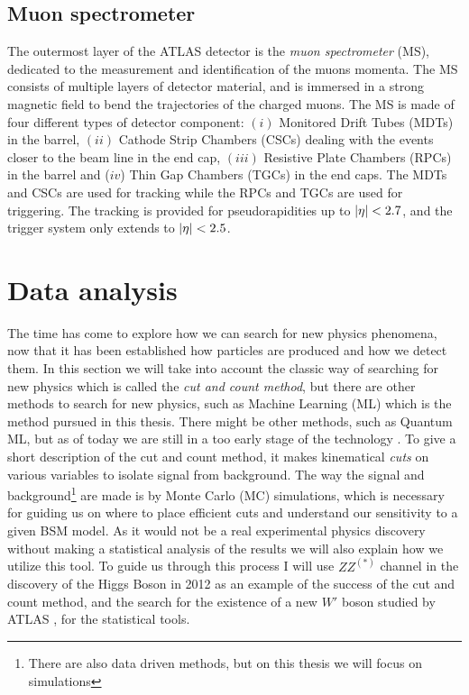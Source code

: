 \documentclass[12pt, a4paper]{book}
\begin{document}
\subsection{Muon spectrometer}\label{sec:MS}
The outermost layer of the ATLAS detector is the \textit{muon spectrometer} (MS), dedicated to the measurement and identification of the muons momenta. The MS consists of multiple layers of detector material, 
and is immersed in a strong magnetic field to bend the trajectories of the charged muons. The MS is made of four different types of detector component: $(i)$ Monitored Drift Tubes (MDTs) in the barrel, 
$(ii)$ Cathode Strip Chambers (CSCs) dealing with the events closer to the beam line in the end cap, $(iii)$ Resistive Plate Chambers (RPCs) in the barrel and ($iv$) Thin Gap Chambers (TGCs) in the end caps. 
The MDTs and CSCs are used for tracking while the RPCs and TGCs are used for triggering. The tracking is provided for pseudorapidities up to $\abs{\eta}<2.7$, and the trigger system only extends to $\abs{\eta}<2.5$.

\section{Data analysis}\label{sec:data_anal}
The time has come to explore how we can search for new physics phenomena, now that it has been established how particles are produced and how we detect them. In this section we will take into account the classic way of searching for new physics which is called 
the \textit{cut and count method}, but there are other methods to search for new physics, such as Machine Learning (ML) which is the method pursued in this thesis. There might be other methods, such as 
Quantum ML, but as of today we are still in a too early stage of the technology \cite{QML}. To give a short description of the cut and count method, it makes kinematical \textit{cuts} on various variables to isolate signal from background. The way 
the signal and background\footnote{There are also data driven methods, but on this thesis we will focus on simulations} are made is by Monte Carlo (MC) simulations, which is necessary for guiding us on where to place efficient cuts and understand our sensitivity to a given BSM model. As it would not be a real experimental physics discovery without making a statistical 
analysis of the results we will also explain how we utilize this tool. To guide us through this process I will use $ZZ^{(*)}$ channel in the discovery of the Higgs Boson in 2012 \cite{Higgs_discovery_2012} as an example of the success of the cut and count method, and 
the search for the existence of a new $W'$ boson studied by ATLAS \cite{Stat}, for the statistical tools.
\end{document}
